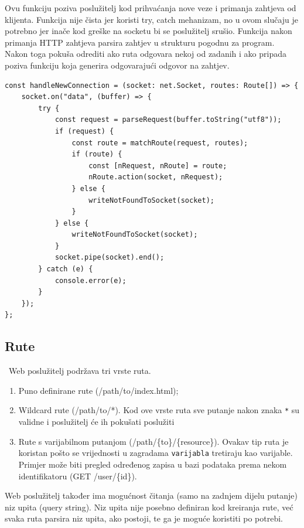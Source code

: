 \documentclass[]{foi}
\begin{document}
Ovu funkciju poziva poslužitelj kod prihvaćanja nove veze i primanja zahtjeva od
klijenta. Funkcija nije čista jer koristi try, catch mehanizam, no u ovom slučaju
je potrebno jer inače kod greške na socketu bi se poslužitelj srušio. Funkcija nakon
primanja HTTP zahtjeva parsira zahtjev u strukturu pogodnu za program. Nakon toga pokuša
odrediti ako ruta odgovara nekoj od zadanih i ako pripada poziva funkciju koja generira
odgovarajući odgovor na zahtjev.
\begin{lstlisting}[caption={Prihvaćanje nove veze i zahtjeva}, label=lst:conn]
const handleNewConnection = (socket: net.Socket, routes: Route[]) => {
    socket.on("data", (buffer) => {
        try {
            const request = parseRequest(buffer.toString("utf8"));
            if (request) {
                const route = matchRoute(request, routes);
                if (route) {
                    const [nRequest, nRoute] = route;
                    nRoute.action(socket, nRequest);
                } else {
                    writeNotFoundToSocket(socket);
                }
            } else {
                writeNotFoundToSocket(socket);
            }
            socket.pipe(socket).end();
        } catch (e) {
            console.error(e);
        }
    });
};
\end{lstlisting}

\subsection{Rute} \
Web poslužitelj podržava tri vrste ruta.
\begin{enumerate}
	\item Puno definirane rute (/path/to/index.html);
	\item Wildcard rute (/path/to/*). Kod ove vrste ruta sve putanje nakon znaka \texttt{*}
	      su validne i poslužitelj će ih pokušati poslužiti
	\item Rute s varijabilnom putanjom (/path/\{to\}/\{resource\}). Ovakav tip ruta je koristan
	      pošto se vrijednosti u zagradama \texttt{varijabla} tretiraju kao varijable.
	      Primjer može biti pregled određenog zapisa u bazi podataka prema nekom identifikatoru
	      (GET /user/\{id\}).
\end{enumerate}
Web poslužitelj također ima mogućnost čitanja (samo na zadnjem dijelu putanje) niz upita (query
string). Niz upita nije posebno definiran kod kreiranja rute, već svaka ruta parsira
niz upita, ako postoji, te ga je moguće koristiti po potrebi.
\end{document}
